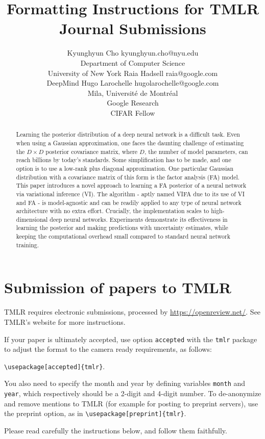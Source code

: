 \documentclass[10pt]{article} %
\title{Formatting Instructions for TMLR \\Journal Submissions}
\author{\name Kyunghyun Cho \email kyunghyun.cho@nyu.edu \\
      \addr Department of Computer Science\\
      University of New York
      \AND
      \name Raia Hadsell \email raia@google.com \\
      \addr DeepMind
      \AND
      \name Hugo Larochelle \email hugolarochelle@google.com\\
      \addr Mila, Universit\'e de Montr\'eal \\
      Google Research\\
      CIFAR Fellow}
\begin{document}
\maketitle


\begin{abstract}
Learning the posterior distribution of a deep neural network is a difficult task. Even when using a Gaussian approximation, one faces the daunting challenge of estimating the $D \times D$ posterior covariance matrix, where $D$, the number of model parameters, can reach billions by today's standards. Some simplification has to be made, and one option is to use a low-rank plus diagonal approximation. One particular Gaussian distribution with a covariance matrix of this form is the factor analysis (FA) model. This paper introduces a novel approach to learning a FA posterior of a neural network via variational inference (VI). The algorithm -  aptly named VIFA due to its use of VI and FA - is model-agnostic and can be readily applied to any type of neural network architecture with no extra effort. Crucially, the implementation scales to high-dimensional deep neural networks. Experiments demonstrate its effectiveness in learning the posterior and making predictions with uncertainty estimates, while keeping the computational overhead small compared to standard neural network training. 
\end{abstract}

\section{Submission of papers to TMLR}

TMLR requires electronic submissions, processed by
\url{https://openreview.net/}. See TMLR's website for more instructions.

If your paper is ultimately accepted, use option {\tt accepted} with the {\tt tmlr} 
package to adjust the format to the camera ready requirements, as follows:
\begin{center}  
  {\tt {\textbackslash}usepackage[accepted]\{tmlr\}}. 
\end{center}
You also need to specify the month and year
by defining variables {\tt month} and {\tt year}, which respectively
should be a 2-digit and 4-digit number. To de-anonymize and remove mentions
to TMLR (for example for posting to preprint servers), use the preprint option,
as in {\tt {\textbackslash}usepackage[preprint]\{tmlr\}}. 

Please read carefully the instructions below, and follow them
faithfully.
\end{document}
